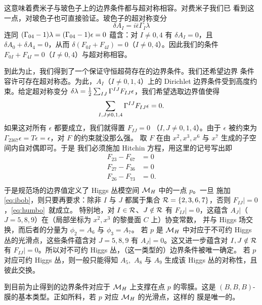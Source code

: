 这意味着费米子与玻色子上的边界条件都与超对称相容。对费米子我们已
看到这一点，对玻色子也可直接验证。玻色子的超对称变分
\setcounter{equation}{13}
\begin{equation}\label{eq:guffo}
\delta A_I=i\bar\epsilon\Gamma_I\lambda
\end{equation}
 连同 $(\Gamma_{04}-1)\lambda=({\Gamma}_{04}-1)\epsilon=0$ 蕴含：对
$I\not= 0,4$ 有 $\delta A_I=0$，且 $\delta A_0+\delta A_4=0$，从而
$\delta(F_{0I}+F_{4I})=0$（$I\not=0,4$）。因此我们的条件
$F_{0I}+F_{4I}=0$（$I\not= 0,4$）与超对称相容。

到此为止，我们得到了一个保证守恒超荷存在的边界条件。我们还希望边界
条件容许可存在超对称态。为此，$A_I$（$I\not=0,1,4$）上的 Dirichlet
边界条件受到高度约束。给定超对称变分 $\delta \lambda= \frac{1}{2}
\sum_{IJ}\Gamma^{IJ}F_{IJ}\epsilon$，我们希望选取边界值使得 %
\setcounter{equation}{14}
\begin{equation}\label{eq:humbo}
\sum_{I,J\not=
0,1,4}{\Gamma}^{IJ}F_{IJ}\epsilon=0.
\end{equation}
 如果这对所有 $\epsilon$ 都要成立，我们就得置 $F_{IJ}=0$
（$I,J\not= 0,1,4$）。由于 $\epsilon$ 被约束为
$\Gamma_{2367}\epsilon=T\epsilon=\epsilon$，对 $F$ 的约束就没那么强。
取 $F$ 在由 $x^2,x^3,x^6$ 与 $x^7$ 生成的子空间内自对偶即可。于是
我们必须施加 Hitchin 方程，用这里的记号写出即
\setcounter{equation}{15}
\begin{equation}\label{eq:ibob}
\begin{aligned}F_{23}-F_{67}& =0\\ F_{27}-F_{36}& = 0 \\
 F_{26}-F_{73}& = 0 . \\\end{aligned}
\end{equation}
  于是规范场的边界值定义了 Higgs 丛模空间 ${{{\mathcal{M}}}_H}$ 中的一点 $p$。一旦
施加 \eqref{eq:ibob}，则只要再要求：除非 $I$ 与 $J$ 都属于集合
${{\mathcal{R}}}=\{2,3,6,7\}$，否则 $F_{IJ}|=0$，\eqref{eq:humbo}\ 就成立。
特别地，对 $I\in {{\mathcal{R}}}$、$J\notin {{\mathcal{R}}}$ 有 $F_{IJ}|=0$，这蕴含
$A_J|$（$J=5,8,9$）在（局部坐标为 $x^2,x^3$ 的黎曼面 $C$ 上）协变常数，
并与 Higgs 场交换，而后者的分量为 $\phi_2=A_6 $ 与 $\phi_3=A_7$。
若 $p$ 是 ${{{\mathcal{M}}}_H}$ 中对应于不可约 Higgs 丛的光滑点，这些条件蕴含对
$J=5,8,9$ 有 $A_J|=0$。这又进一步蕴含对 $I,J\notin {{\mathcal{R}}}$ 有
$F_{IJ}|=0$。所以对不可约 Higgs 丛，（这一类型的）边界条件被唯一确定。
若 $p$ 对应可约 Higgs 丛，则一般只能得知 $A_5,$ $A_8$ 与 $A_9$ 生成该
Higgs 丛的对称性，且彼此交换。

到目前为止得到的边界条件对应于 ${{{\mathcal{M}}}_H}$ 上支撑在点 $p$ 的零膜。这是
$(B,B,B)$-膜的基本类型。正如所料，若 $p$ 对应 ${{{\mathcal{M}}}_H}$ 的光滑点，这样的
膜是唯一的。

